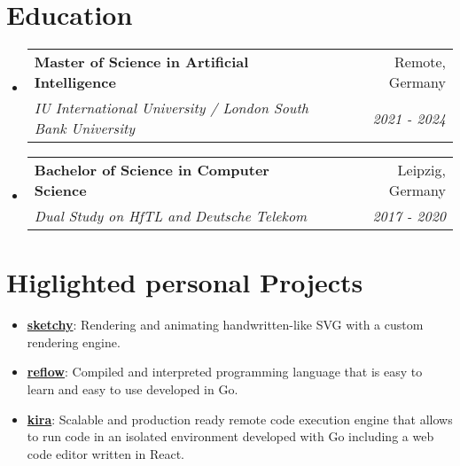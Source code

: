 \documentclass[letterpaper,11pt]{article}
\makeatletter
\newcommand{\resumeItem}[2]{
  \item\small{
    \textbf{#1}{: #2}
  }
}
\newcommand{\resumeSubheading}[4]{
  \vspace{-1pt}\item
    \begin{tabular*}{0.97\textwidth}[t]{l@{\extracolsep{\fill}}r}
      \textbf{#1} & #2 \\
      \textit{\small#3} & \textit{\small #4} \\
    \end{tabular*}
}
\newcommand{\resumeSubItem}[2]{\resumeItem{#1}{#2}}
\newcommand{\resumeSubHeadingListStart}{\begin{itemize}[leftmargin=*]}
\newcommand{\resumeSubHeadingListEnd}{\end{itemize}}
\makeatother
\begin{document}
\section{Education}
  \resumeSubHeadingListStart
    \resumeSubheading
      {Master of Science in Artificial Intelligence}{Remote, Germany}
      {IU International University / London South Bank University}{2021 - 2024}
      \vspace{-10pt}
    \resumeSubheading
      {Bachelor of Science in Computer Science}{Leipzig, Germany}
      {Dual Study on HfTL and Deutsche Telekom}{2017 - 2020}
  \resumeSubHeadingListEnd


\section{Higlighted personal Projects}
  \resumeSubHeadingListStart
    \resumeSubItem{\href{https://sketchy-virid.vercel.app/}{sketchy}}
      {Rendering and animating handwritten-like SVG with a custom rendering engine.}
      \vspace{-5pt}
    \resumeSubItem{\href{https://github.com/FlorianWoelki/reflow}{reflow}}
      {Compiled and interpreted programming language that is easy to learn and easy to use developed in Go.}
      \vspace{-5pt}
    \resumeSubItem{\href{https://github.com/FlorianWoelki/kira}{kira}}
      {Scalable and production ready remote code execution engine that allows to run code in an isolated environment developed with Go including a web code editor written in React.}
      \vspace{-5pt}
  \resumeSubHeadingListEnd


\end{document}

